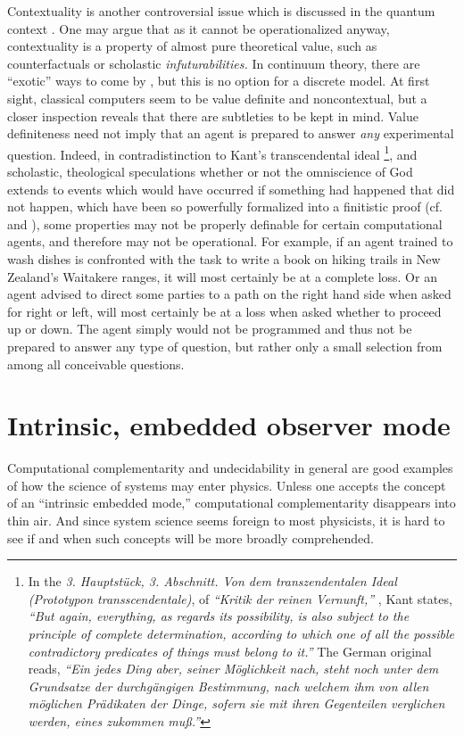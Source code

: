 \documentclass[pre,preprint,showpacs,showkeys,amsfonts]{revtex4}
\begin{document}
Contextuality is another controversial issue which
is discussed in the quantum context \cite{redhead}.
One may argue that as it cannot be operationalized anyway,
contextuality is a property of almost pure theoretical value,
such as counterfactuals or scholastic {\it infuturabilities.}
In continuum theory, there are ``exotic'' ways to come by
\cite{pitowsky-82,meyer:99},
but this is no option for a discrete model.
At first sight, classical computers seem to be value definite
and noncontextual, but a closer inspection reveals
that there are subtleties to be kept in mind.
Value definiteness need not imply that an
agent is prepared to answer {\em any} experimental
question.
Indeed, in contradistinction to Kant's
transcendental ideal
\footnote{
In the {\it 3. Hauptst\"uck, 3. Abschnitt.
Von dem transzendentalen Ideal (Prototypon transscendentale)},
of {\it ``Kritik der reinen Vernunft,''} \cite{kant-kdrv}, Kant states,
{\it ``But again, everything, as regards its possibility, is also subject
to the principle of complete determination, according to which one
of all the possible contradictory predicates of things must belong
to it.''}
The German original reads, {\it ``Ein jedes Ding aber, seiner M\"oglichkeit nach,
steht noch unter dem Grundsatze der durchg\"angigen Bestimmung,
nach welchem ihm von allen m\"oglichen Pr\"adikaten der Dinge,
sofern sie mit ihren Gegenteilen verglichen werden, eines zukommen mu\ss.''}
},
and scholastic, theological speculations whether or not
the omniscience of God extends to events which
would have occurred if something  had happened that did not
happen, which have been so powerfully
formalized into a finitistic proof
(cf.
\cite[p. 243]{specker-60} and
\cite[p. 179]{specker-ges}),
some properties may not be properly definable for certain computational agents,
and therefore may not be operational.
For example, if an agent trained to wash dishes
is confronted with the task to write a book on hiking trails
in New Zealand's Waitakere ranges, it
will most certainly be at a complete loss.
Or an agent advised to direct some parties
to a path on the right hand side when asked
for right or left, will most certainly be at a
loss when asked whether to proceed up or down.
The agent simply would not be programmed and thus not be prepared to answer
any type of question,
but rather only a small selection from among all conceivable questions.



\section{Intrinsic, embedded observer mode}
Computational complementarity and undecidability in general
are good examples of how the science of systems may enter physics.
Unless one accepts the concept of an ``intrinsic embedded mode,''
computational complementarity disappears into thin air.
And since system science seems foreign to most physicists,
it is hard to see if and when such concepts will be more
broadly comprehended.
\end{document}
